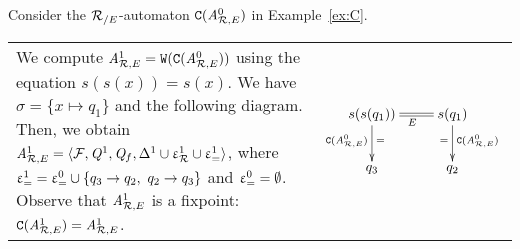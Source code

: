 \begin{example}
  \label{ex:W}
  Consider the ${\mathcal R_{/E}}$-automaton $\mathtt{C}({\it A}_{\mathcal R,E}^0)$ in Example~\ref{ex:C}.\\
  \begin{tabular}{lc}
    \hspace{-.3cm}
    \begin{minipage}{.75\linewidth}
      We compute ${\it A}_{\mathcal R,E}^1 = \mathtt{W}(\mathtt{C}({\it A}_{\mathcal R,E}^0))$ using the equation
      $s(s(x))=s(x)$.  We have $\sigma=\{x \mapsto q_1\}$ and the
      following diagram.  Then, we obtain ${\it A}_{\mathcal R,E}^1 = \langle \mathcal{F}, \mathit Q^1,
      \mathit Q_f, \Delta^1 \cup \upvarepsilon_{\mathcal R}^1 \cup \upvarepsilon_{=}^1\rangle$, where $\upvarepsilon_{=}^1= \upvarepsilon_{=}^0 \cup \{
      q_3 \rightarrow q_2,\ q_2 \rightarrow q_3\}$ and $\upvarepsilon_{=}^0=\emptyset$.  Observe that ${\it A}_{\mathcal R,E}^1$ is a
      fixpoint: $\mathtt{C}({\it A}_{\mathcal R,E}^1) = {\it A}_{\mathcal R,E}^1$.
    \end{minipage}&
    \begin{minipage}{.25\linewidth}
      $\xymatrix{
        s(s(q_1)) \ar@{=}[r]_{E}\ar[d]^{=}_{\compl(\aaexeq^0)} & s(q_1) \ar[d]^{\compl(\aaexeq^0)}_{=}\\
        q_3 & q_2
      }$
    \end{minipage}
  \end{tabular}
\end{example}





